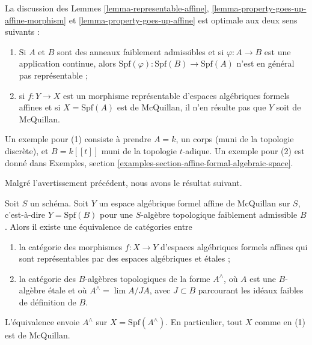 \begin{remark}[Avertissement]
\label{remark-warning}
La discussion des Lemmes \ref{lemma-representable-affine},
\ref{lemma-property-goes-up-affine-morphism} et
\ref{lemma-property-goes-up-affine}
est optimale aux deux sens suivants :
\begin{enumerate}
\item Si $A$ et $B$ sont des anneaux faiblement admissibles et si $\varphi : A \to B$
est une application continue, alors
$\text{Spf}(\varphi) : \text{Spf}(B) \to \text{Spf}(A)$ n'est en général
pas représentable ;
\item si $f : Y \to X$ est un morphisme représentable d'espaces algébriques
formels affines et si $X = \text{Spf}(A)$ est de McQuillan,
il n'en résulte pas que $Y$ soit de McQuillan.
\end{enumerate}
Un exemple pour (1) consiste à prendre $A = k$, un corps (muni de la topologie discrète),
et $B = k[[t]]$ muni de la topologie $t$-adique.
Un exemple pour (2) est donné dans
Exemples, section \ref{examples-section-affine-formal-algebraic-space}.
\end{remark}

\noindent
Malgré l'avertissement précédent, nous avons le résultat suivant.

\begin{lemma}
\label{lemma-etale}
Soit $S$ un schéma. Soit $Y$ un espace algébrique formel affine de McQuillan
sur $S$, c'est-à-dire $Y = \text{Spf}(B)$ pour une $S$-algèbre topologique
faiblement admissible $B$. Alors il existe une équivalence de catégories entre
\begin{enumerate}
\item la catégorie des morphismes $f : X \to Y$
d'espaces algébriques formels affines qui sont représentables
par des espaces algébriques et étales ;
\item la catégorie des $B$-algèbres topologiques de la forme
$A^\wedge$, où $A$ est une $B$-algèbre étale et où
$A^\wedge = \lim A/JA$, avec $J \subset B$ parcourant les
idéaux faibles de définition de $B$.
\end{enumerate}
L'équivalence envoie $A^\wedge$ sur $X = \text{Spf}(A^\wedge)$.
En particulier, tout $X$ comme en (1) est de McQuillan.
\end{lemma}

